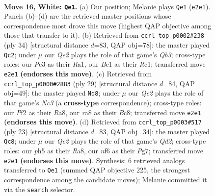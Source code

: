 \documentclass[11pt]{article}
\begin{document}
\begin{figure}[p]
\label{fig:thought-m28}
\end{figure}

\clearpage

\begin{figure}[p]\centering
\begin{subfigure}{0.46\textwidth}\centering
\resizebox{\linewidth}{!}{%
\newchessgame
\chessboard[
  setfen={r1b2rk1/5p2/2p2np1/p1pqp1Np/7P/2PP2P1/P1P1QP2/R1B2RK1 w - - 0 16},
  showmover=false,
  pgfstyle=straightmove, color=movearrow, markmove={e2-e1}
]}
\caption{}
\end{subfigure}\hfill
\begin{subfigure}{0.46\textwidth}\centering
\resizebox{\linewidth}{!}{%
\newchessgame
\chessboard[
  setfen={r1bq2k1/4rpp1/1pp2n1p/p7/P2Pp3/1QN1P2P/1P1N1PP1/R1R3K1 w - - 0 18},
  showmover=false,
  pgfstyle=straightmove, color=movearrow, markmove={b3-c2}
]}
\caption{}
\end{subfigure}
\\[4pt]
\begin{subfigure}{0.46\textwidth}\centering
\resizebox{\linewidth}{!}{%
\newchessgame
\chessboard[
  setfen={r1b2rk1/pp4pp/2n3p1/3pPpB1/q1pP4/P1P3Q1/2P1N1PP/R4RK1 b - - 1 15},
  showmover=false,
  pgfstyle=straightmove, color=movearrow, markmove={c6-d8}
]}
\caption{}
\end{subfigure}\hfill
\begin{subfigure}{0.46\textwidth}\centering
\resizebox{\linewidth}{!}{%
\newchessgame
\chessboard[
  setfen={r5nr/p2q1kpp/np2p3/2ppPp2/P2P4/2PQ4/2P1NPPP/R1B1K2R b KQ - 3 12},
  showmover=false,
  pgfstyle=straightmove, color=movearrow, markmove={d7-c8}
]}
\caption{}
\end{subfigure}
\caption{\textbf{Move 16, White: \texttt{Qe1}.} (a) Our position; Melanie plays \texttt{Qe1} (\texttt{e2e1}). Panels (b)--(d) are the retrieved master positions whose correspondence most drove this move (highest QAP objective among those that transfer to it). (b) Retrieved from \texttt{ccrl\_top\_p0002\#238} (ply 34) [structural distance $d$=83, QAP obj=78]: the master played \texttt{Qc2}; under $\mu$ our \emph{Qe2} plays the role of that game's \emph{Qb3}; cross-type roles: our \emph{P}c3 as their \emph{R}a1, our \emph{B}c1 as their \emph{R}c1; transferred move \texttt{e2e1} \textbf{(endorses this move)}. (c) Retrieved from \texttt{ccrl\_top\_p0000\#2883} (ply 29) [structural distance $d$=84, QAP obj=49]: the master played \texttt{Nd8}; under $\mu$ our \emph{Qe2} plays the role of that game's \emph{Nc3} (a \textbf{cross-type} correspondence); cross-type roles: our \emph{P}f2 as their \emph{R}a8, our \emph{r}a8 as their \emph{B}c8; transferred move \texttt{e2e1} \textbf{(endorses this move)}. (d) Retrieved from \texttt{ccrl\_top\_p0003\#517} (ply 23) [structural distance $d$=83, QAP obj=34]: the master played \texttt{Qc8}; under $\mu$ our \emph{Qe2} plays the role of that game's \emph{Qd2}; cross-type roles: our \emph{p}h5 as their \emph{R}a8, our \emph{n}f6 as their \emph{P}g7; transferred move \texttt{e2e1} \textbf{(endorses this move)}. Synthesis: 6 retrieved analogs transferred to \texttt{Qe1} (summed QAP objective 225, the strongest correspondence among the candidate moves); Melanie committed it via the \texttt{search} selector.}

\end{figure}
\end{document}
